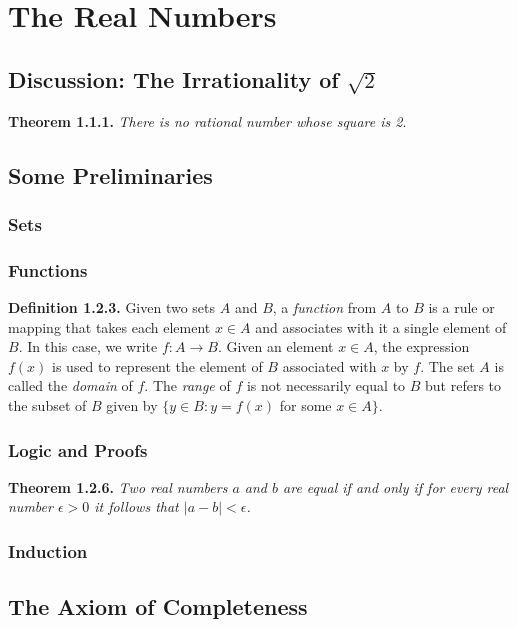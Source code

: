 \documentclass[12pt]{report}
\begin{document}
\chapter{The Real Numbers}

\section{Discussion: The Irrationality of $\sqrt{2}$}

\noindent \textbf{Theorem 1.1.1.} \textit{There is no rational number whose square is 2.}

\section{Some Preliminaries}

\subsection*{Sets}

\subsection*{Functions}

\noindent \textbf{Definition 1.2.3.} Given two sets $A$ and $B$, a \textit{function} from $A$ to $B$ is a rule or mapping that takes each element $x\in A$ and associates with it a single element of $B$.  In this case, we write $f:A\rightarrow B$. Given an element $x\in A$, the expression $f(x)$ is used to represent the element of $B$ associated with $x$ by $f$. The set $A$ is called the \textit{domain} of $f$. The \textit{range} of $f$ is not necessarily equal to $B$ but refers to the subset of $B$ given by $\{y\in B:y=f(x)$ for some $x\in A\}$.

\subsection*{Logic and Proofs}

\noindent \textbf{Theorem 1.2.6.} \textit{Two real numbers $a$ and $b$ are equal if and only if for every real number $\epsilon>0$ it follows that $|a-b|<\epsilon$.}

\subsection*{Induction}

\section{The Axiom of Completeness}
\end{document}
